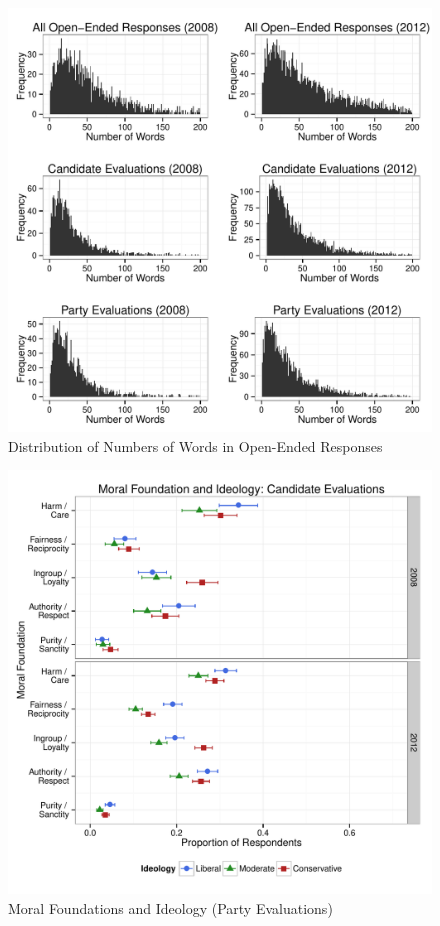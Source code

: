 \documentclass[12pt]{article}
\begin{document}
\begin{figure}[ht]\centering
\includegraphics[scale=.6]{../calc/fig/a0_num.pdf}
\caption{Distribution of Numbers of Words in Open-Ended Responses}\label{fig:a0_num}
\end{figure}

\begin{figure}\centering
\includegraphics[scale=.4]{../calc/fig/p2_mft_ideol_ca.pdf}
\caption{Moral Foundations and Ideology (Party Evaluations)}\label{fig:mft_ideol_pa}
\end{figure}
\end{document}
